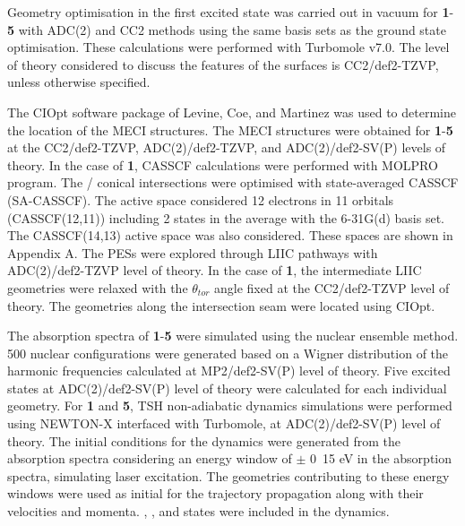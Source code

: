 Geometry optimisation in the first excited state was carried out in vacuum for \textbf{1}-\textbf{5} with ADC(2) and CC2 methods using the same basis sets as the ground state optimisation. These calculations were performed with Turbomole v7.0.\cite{Turbomole} The level of theory considered to discuss the features of the surfaces is CC2/def2-TZVP, unless otherwise specified.

The CIOpt software package of Levine, Coe, and Martinez was used to determine the location of the \acf{MECI} structures.\cite{Levine2008} The MECI structures were obtained for \textbf{1}-\textbf{5} at the CC2/def2-TZVP, ADC(2)/def2-TZVP, and ADC(2)/def2-SV(P) levels of theory. In the case of \textbf{1}, \ac{CASSCF} calculations were performed with MOLPRO program.\cite{Molpro} The \sone/\szero{} conical intersections were optimised with state-averaged CASSCF (SA-CASSCF). The active space considered 12 electrons in 11 orbitals (CASSCF(12,11)) including 2 states in the average with the 6-31G(d) basis set. The CASSCF(14,13) active space was also considered. These spaces are shown in Appendix A. The \acp{PES} were explored through \ac{LIIC} pathways with ADC(2)/def2-TZVP level of theory. In the case of \textbf{1}, the intermediate \ac{LIIC} geometries were relaxed with the $\theta_{tor}$ angle fixed at the CC2/def2-TZVP level of theory. The geometries along the intersection seam were located using CIOpt. 

The absorption spectra of \textbf{1}-\textbf{5} were simulated using the nuclear ensemble method. 500 nuclear configurations were generated based on a Wigner distribution of the harmonic frequencies calculated at MP2/def2-SV(P) level of theory.\cite{Crespo-Otero2012} Five excited states at ADC(2)/def2-SV(P) level of theory were calculated for each individual geometry. For \textbf{1} and \textbf{5}, \acf{TSH} non-adiabatic dynamics simulations were performed using NEWTON-X interfaced with Turbomole, at ADC(2)/def2-SV(P) level of theory.\cite{Barbatti2014} The initial conditions for the dynamics were generated from the absorption spectra considering an energy window of $\pm$ \si{0.15} {eV} in the absorption spectra, simulating laser excitation.\cite{Barbatti2007} The geometries contributing to these energy windows were used as initial for the trajectory propagation along with their velocities and momenta. \szero{}, \sone{}, and \stwo{} states were included in the dynamics. 

